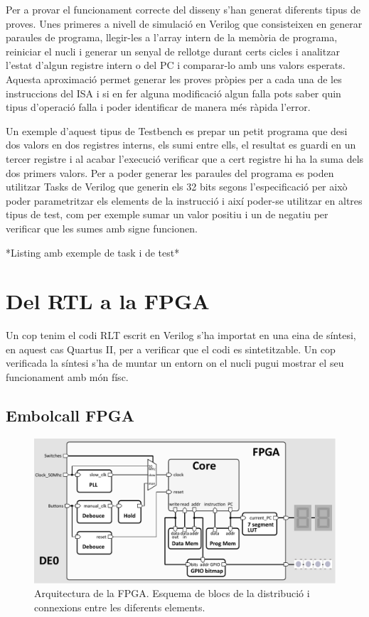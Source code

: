 \documentclass[10pt,a4paper,twocolumn,twoside]{article}
\begin{document}
Per a provar el funcionament correcte del disseny s'han generat diferents tipus de proves.
Unes primeres a nivell de simulació en Verilog que consisteixen en generar paraules de programa, llegir-les a l'array intern de la memòria de programa, reiniciar el nucli i generar un senyal de rellotge durant certs cicles i analitzar l'estat d'algun registre intern o del PC i comparar-lo amb uns valors esperats. Aquesta aproximació permet generar les proves pròpies per a cada una de les instruccions del ISA i si en fer alguna modificació algun falla pots saber quin tipus d'operació falla i poder identificar de manera més ràpida l'error.

Un exemple d'aquest tipus de Testbench es prepar un petit programa que desi dos valors en dos registres interns, els sumi entre ells, el resultat es guardi en un tercer registre i al acabar l'execució verificar que a cert registre hi ha la suma dels dos primers valors. Per a poder generar les paraules del programa es poden utilitzar Tasks de Verilog que generin els 32 bits segons l'especificació per això poder parametritzar els elements de la instrucció i així poder-se utilitzar en altres tipus de test, com per exemple sumar un valor positiu i un de negatiu per verificar que les sumes amb signe funcionen. 

*Listing amb exemple de task i de test*


\section{Del RTL a la FPGA}  %
Un cop tenim el codi RLT escrit en Verilog s'ha importat en una eina de síntesi, en aquest cas Quartus II, per a verificar que el codi es sintetitzable. Un cop verificada la síntesi s'ha de muntar un entorn on el nucli pugui mostrar el seu funcionament amb món físc.
    \subsection{Embolcall FPGA}
        \begin{figure}[!ht]
    \centering
    	\includegraphics[width=0.9\linewidth]{pdf/arch_FPGA.pdf}
        \caption{Arquitectura de la FPGA. Esquema de blocs de la distribució i connexions entre les diferents elements.}
        \label{fig:FPGA_arch}
    \end{figure}
    
\end{document}
